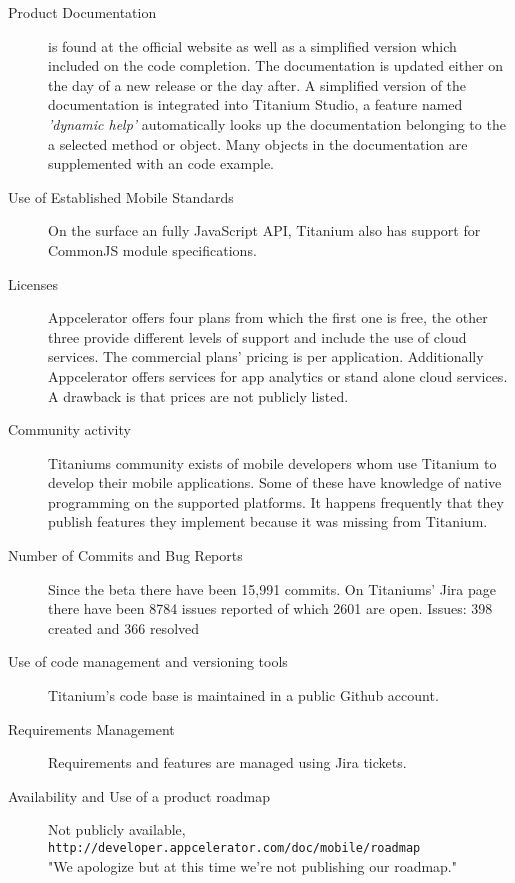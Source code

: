 \begin{description}
\item [Product Documentation] is found at the official website as well as a simplified version which included on the code completion.
The documentation is updated either on the day of a new release or the day after.\cite{Inc2012b} A simplified version of the documentation is integrated into Titanium Studio, a feature named \emph{'dynamic help'} automatically looks up the documentation belonging to the a selected method or object.
Many objects in the documentation are supplemented with an code example.
\item [Use of Established Mobile Standards] 
On the surface an fully JavaScript API, Titanium also has support for CommonJS module specifications. 
\item [Licenses] Appcelerator offers four plans from which the first one is free, the other three provide different levels of support and include the use of cloud services. The commercial plans' pricing is per application. Additionally Appcelerator offers services for app analytics or stand alone cloud services. A drawback is that prices are not publicly listed.
\item [Community activity] Titaniums community exists of mobile developers whom use Titanium to develop their mobile applications. Some of these have knowledge of native programming on the supported platforms. It happens frequently that they publish features they implement because it was missing from Titanium. 
\item [Number of Commits and Bug Reports] Since the beta there have been 15,991 commits. %
On Titaniums' Jira page there have been 8784 issues reported of which 2601 are open.
Issues: 398 created and 366 resolved
\item [Use of code management and versioning tools] Titanium's code base is maintained in a public Github account.%
\item [Requirements Management] Requirements and features are managed using Jira tickets.
\item [Availability and Use of a product roadmap] Not publicly available,\\
\texttt{http://developer.appcelerator.com/doc/mobile/roadmap}\\
"We apologize but at this time we're not publishing our roadmap."
\end{description}